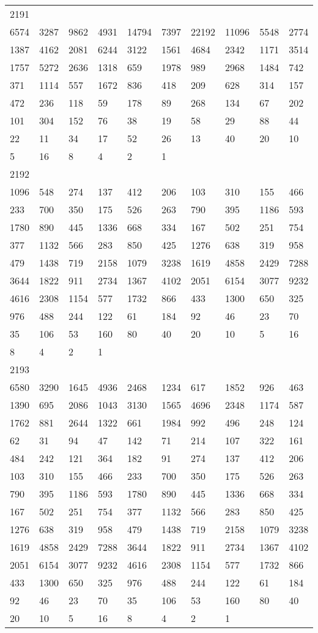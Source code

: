 \begin{longtable}{*{10}{l}}
2191&&&&&&&&&\\
6574& 3287& 9862& 4931& 14794& 7397& 22192& 11096& 5548& 2774\\
1387& 4162& 2081& 6244& 3122& 1561& 4684& 2342& 1171& 3514\\
1757& 5272& 2636& 1318& 659& 1978& 989& 2968& 1484& 742\\
371& 1114& 557& 1672& 836& 418& 209& 628& 314& 157\\
472& 236& 118& 59& 178& 89& 268& 134& 67& 202\\
101& 304& 152& 76& 38& 19& 58& 29& 88& 44\\
22& 11& 34& 17& 52& 26& 13& 40& 20& 10\\
5& 16& 8& 4& 2& 1& \\

2192&&&&&&&&&\\
1096& 548& 274& 137& 412& 206& 103& 310& 155& 466\\
233& 700& 350& 175& 526& 263& 790& 395& 1186& 593\\
1780& 890& 445& 1336& 668& 334& 167& 502& 251& 754\\
377& 1132& 566& 283& 850& 425& 1276& 638& 319& 958\\
479& 1438& 719& 2158& 1079& 3238& 1619& 4858& 2429& 7288\\
3644& 1822& 911& 2734& 1367& 4102& 2051& 6154& 3077& 9232\\
4616& 2308& 1154& 577& 1732& 866& 433& 1300& 650& 325\\
976& 488& 244& 122& 61& 184& 92& 46& 23& 70\\
35& 106& 53& 160& 80& 40& 20& 10& 5& 16\\
8& 4& 2& 1& \\

2193&&&&&&&&&\\
6580& 3290& 1645& 4936& 2468& 1234& 617& 1852& 926& 463\\
1390& 695& 2086& 1043& 3130& 1565& 4696& 2348& 1174& 587\\
1762& 881& 2644& 1322& 661& 1984& 992& 496& 248& 124\\
62& 31& 94& 47& 142& 71& 214& 107& 322& 161\\
484& 242& 121& 364& 182& 91& 274& 137& 412& 206\\
103& 310& 155& 466& 233& 700& 350& 175& 526& 263\\
790& 395& 1186& 593& 1780& 890& 445& 1336& 668& 334\\
167& 502& 251& 754& 377& 1132& 566& 283& 850& 425\\
1276& 638& 319& 958& 479& 1438& 719& 2158& 1079& 3238\\
1619& 4858& 2429& 7288& 3644& 1822& 911& 2734& 1367& 4102\\
2051& 6154& 3077& 9232& 4616& 2308& 1154& 577& 1732& 866\\
433& 1300& 650& 325& 976& 488& 244& 122& 61& 184\\
92& 46& 23& 70& 35& 106& 53& 160& 80& 40\\
20& 10& 5& 16& 8& 4& 2& 1& \\


\end{longtable}
